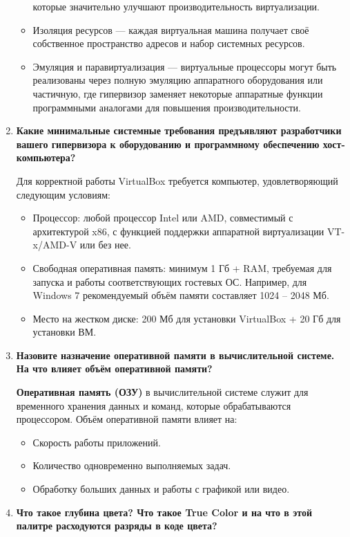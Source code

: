 \begin{enumerate}
\begin{itemize}
				которые значительно улучшают производительность виртуализации.
			\item Изоляция ресурсов --- каждая виртуальная машина получает
				своё собственное пространство адресов
				и набор системных ресурсов.
			\item Эмуляция и паравиртуализация --- виртуальные процессоры
				могут быть реализованы через полную эмуляцию аппаратного
				оборудования или частичную,
				где гипервизор заменяет некоторые аппаратные функции
				программными аналогами для повышения производительности.
		\end{itemize}
	\item \textbf{Какие минимальные системные требования предъявляют
			разработчики вашего гипервизора к оборудованию
			и программному обеспечению хост-компьютера?}\par
		Для корректной работы VirtualBox требуется компьютер,
		удовлетворяющий следующим условиям:
		\begin{itemize}
			\item Процессор: любой процессор Intel или AMD,
				совместимый с архитектурой x86,
				с функцией поддержки аппаратной виртуализации VT-x/AMD-V
				или без нее.
			\item Свободная оперативная память: минимум 1 Гб + RAM,
				требуемая для запуска и работы соответствующих гостевых ОС.
				Например, для Windows 7 рекомендуемый объём памяти составляет
				1024 -- 2048 Мб.
			\item Место на жестком диске:
				200 Мб для установки VirtualBox + 20 Гб для установки ВМ.
		\end{itemize}
	\item \textbf{Назовите назначение оперативной памяти в вычислительной
			системе. На что влияет объём оперативной памяти?}\par
		\textbf{Оперативная память (ОЗУ)} в вычислительной системе служит
		для временного хранения данных и команд,
		которые обрабатываются процессором.
		Объём оперативной памяти влияет на:
		\begin{itemize}
			\item Скорость работы приложений.
			\item Количество одновременно выполняемых задач.
			\item Обработку больших данных и работы с графикой или видео.
		\end{itemize}
	\item \textbf{Что такое глубина цвета? Что такое True Color
			и на что в этой палитре расходуются разряды в коде цвета?}\par

\end{enumerate}

